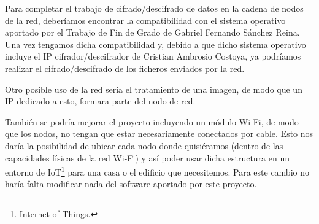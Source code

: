 Para completar el trabajo de cifrado/descifrado de datos en la cadena de nodos de la red, deberíamos encontrar la compatibilidad con el sistema operativo aportado por el Trabajo de Fin de Grado de Gabriel Fernando Sánchez Reina. Una vez tengamos dicha compatibilidad y, debido a que dicho sistema operativo incluye el IP cifrador/descifrador de Cristian Ambrosio Costoya, ya podríamos realizar el cifrado/descifrado de los ficheros enviados por la red.

Otro posible uso de la red sería el tratamiento de una imagen, de modo que un IP dedicado a esto, formara parte del nodo de red.

También se podría mejorar el proyecto incluyendo un módulo Wi-Fi, de modo que los nodos, no tengan que estar necesariamente conectados por cable. Esto nos daría la posibilidad de ubicar cada nodo donde quisiéramos (dentro de las capacidades físicas de la red Wi-Fi) y así poder usar dicha estructura en un entorno de IoT\footnote{Internet of Things.} para una casa o el edificio que necesitemos. Para este cambio no haría falta modificar nada del software aportado por este proyecto.
